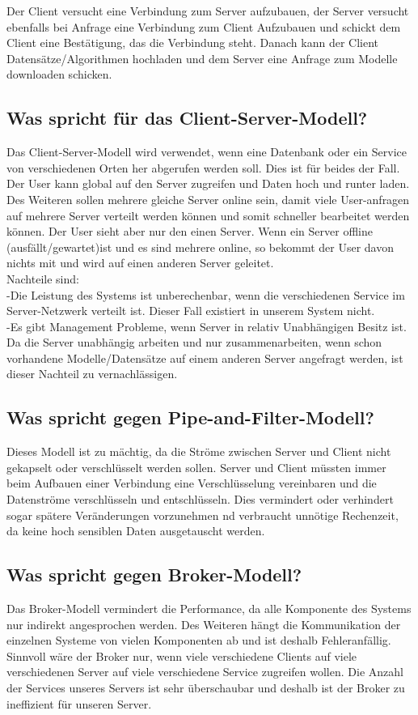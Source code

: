 Der Client versucht eine Verbindung zum Server aufzubauen, der Server versucht ebenfalls bei Anfrage eine Verbindung zum Client Aufzubauen und schickt dem Client eine Bestätigung, das die Verbindung steht. Danach kann der Client Datensätze/Algorithmen hochladen und dem Server eine Anfrage zum Modelle downloaden schicken.

\subsection*{Was spricht für das Client-Server-Modell?}
Das Client-Server-Modell wird verwendet, wenn eine Datenbank oder ein Service von verschiedenen Orten her abgerufen werden soll. Dies ist für beides der Fall. Der User kann global auf den Server zugreifen und Daten hoch und runter laden.\\
Des Weiteren sollen mehrere gleiche Server online sein, damit viele User-anfragen auf mehrere Server verteilt werden können und somit schneller bearbeitet werden können. Der User sieht aber nur den einen Server. Wenn ein Server offline (ausfällt/gewartet)ist und es sind mehrere online, so bekommt der User davon nichts mit und wird auf einen anderen Server geleitet.\\
Nachteile sind:\\
-Die Leistung des Systems ist unberechenbar, wenn die verschiedenen Service im Server-Netzwerk verteilt ist. Dieser Fall existiert in unserem System nicht.\\
-Es gibt Management Probleme, wenn Server in relativ Unabhängigen Besitz ist. Da die Server unabhängig arbeiten und nur zusammenarbeiten, wenn schon vorhandene Modelle/Datensätze auf einem anderen Server angefragt werden, ist dieser Nachteil zu vernachlässigen.

\subsection*{Was spricht gegen Pipe-and-Filter-Modell?}
Dieses Modell ist zu mächtig, da die Ströme zwischen Server und Client nicht gekapselt oder verschlüsselt werden sollen. Server und Client müssten immer beim Aufbauen einer Verbindung eine Verschlüsselung vereinbaren und die Datenströme verschlüsseln und entschlüsseln. Dies vermindert oder verhindert sogar spätere Veränderungen vorzunehmen nd verbraucht unnötige Rechenzeit, da keine hoch sensiblen Daten ausgetauscht werden.

\subsection*{Was spricht gegen Broker-Modell?}
Das Broker-Modell vermindert die Performance, da alle Komponente des Systems nur indirekt angesprochen werden. Des Weiteren hängt die Kommunikation der einzelnen Systeme von vielen Komponenten ab und ist deshalb Fehleranfällig.
Sinnvoll wäre der Broker nur, wenn viele verschiedene Clients auf viele verschiedenen Server auf viele verschiedene Service zugreifen wollen. Die Anzahl der Services unseres Servers ist sehr überschaubar und deshalb ist der Broker zu ineffizient für unseren Server.

%